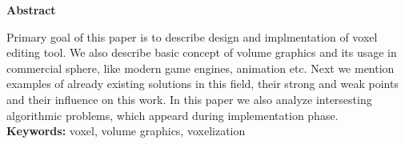 
\begin{Huge}
\textbf{Abstract}  \\
\end{Huge}

Primary goal of this paper is to describe design and implmentation of voxel editing tool. We also describe basic concept of volume graphics and its usage in commercial sphere, like modern game engines, animation etc. Next we mention examples of already existing solutions in this field, their strong and weak points and their influence on this work. In this paper we also analyze intersesting algorithmic problems, which appeard during implementation phase. \\

\textbf{Keywords:} voxel, volume graphics, voxelization